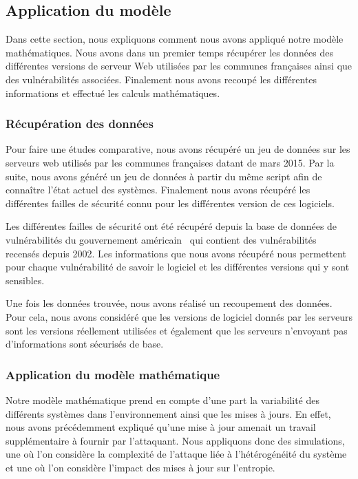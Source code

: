 \subsection{Application du modèle}\label{sec:simulation}
Dans cette section, nous expliquons comment nous avons appliqué notre modèle mathématiques.
Nous avons dans un premier temps récupérer les données des différentes versions de serveur Web utilisées par les communes françaises ainsi que des vulnérabilités associées.
Finalement nous avons recoupé les différentes informations et effectué les calculs mathématiques.

\subsubsection{Récupération des données}\label{sec:recupData}
Pour faire une études comparative, nous avons récupéré un jeu de données sur les serveurs web utilisés par les communes françaises datant de mars 2015.
Par la suite, nous avons généré un jeu de données à partir du même script afin de connaître l'état actuel des systèmes.
Finalement nous avons récupéré les différentes failles de sécurité connu pour les différentes version de ces logiciels.

Les différentes failles de sécurité ont été récupéré depuis la base de données de vulnérabilités du gouvernement américain~\cite{vulnDatabase} qui contient des vulnérabilités recensés depuis 2002.
Les informations que nous avons récupéré nous permettent pour chaque vulnérabilité de savoir le logiciel et les différentes versions qui y sont sensibles.


Une fois les données trouvée, nous avons réalisé un recoupement des données.
Pour cela, nous avons considéré que les versions de logiciel donnés par les serveurs sont les versions réellement utilisées et également que les serveurs n'envoyant pas d'informations sont sécurisés de base.


\subsubsection{Application du modèle mathématique}
Notre modèle mathématique prend en compte d'une part la variabilité des différents systèmes dans l'environnement ainsi que les mises à jours.
En effet, nous avons précédemment expliqué qu'une mise à jour amenait un travail supplémentaire à fournir par l'attaquant.
Nous appliquons donc des simulations, une où l'on considère la complexité de l'attaque liée à l'hétérogénéité du système et une où l'on considère l'impact des mises à jour sur l'entropie.

